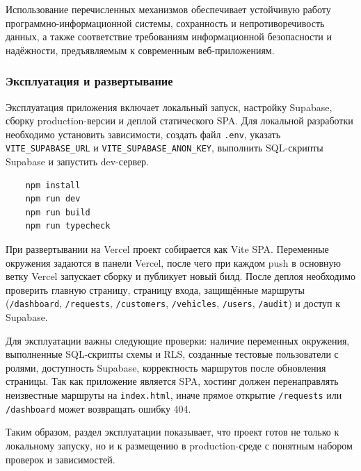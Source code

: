 Использование перечисленных механизмов обеспечивает устойчивую работу программно-информационной системы, сохранность и непротиворечивость данных, а также соответствие требованиям информационной безопасности и надёжности, предъявляемым к современным веб-приложениям.

\subsubsection{Эксплуатация и развертывание}

Эксплуатация приложения включает локальный запуск, настройку Supabase, сборку production-версии и деплой статического SPA. Для локальной разработки необходимо установить зависимости, создать файл \texttt{.env}, указать \texttt{VITE\_SUPABASE\_URL} и \texttt{VITE\_SUPABASE\_ANON\_KEY}, выполнить SQL-скрипты Supabase и запустить dev-сервер.

\begin{verbatim}
	npm install
	npm run dev
	npm run build
	npm run typecheck
\end{verbatim}

При развертывании на Vercel проект собирается как Vite SPA. Переменные окружения задаются в панели Vercel, после чего при каждом push в основную ветку Vercel запускает сборку и публикует новый билд. После деплоя необходимо проверить главную страницу, страницу входа, защищённые маршруты (\texttt{/dashboard}, \texttt{/requests}, \texttt{/customers}, \texttt{/vehicles}, \texttt{/users}, \texttt{/audit}) и доступ к Supabase.

Для эксплуатации важны следующие проверки: наличие переменных окружения, выполненные SQL-скрипты схемы и RLS, созданные тестовые пользователи с ролями, доступность Supabase, корректность маршрутов после обновления страницы. Так как приложение является SPA, хостинг должен перенаправлять неизвестные маршруты на \texttt{index.html}, иначе прямое открытие \texttt{/requests} или \texttt{/dashboard} может возвращать ошибку 404.

Таким образом, раздел эксплуатации показывает, что проект готов не только к локальному запуску, но и к размещению в production-среде с понятным набором проверок и зависимостей.
